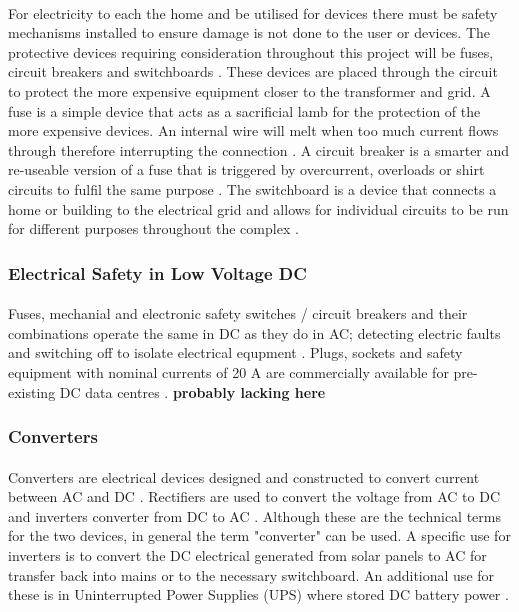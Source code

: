 \paragraph{}
For electricity to each the home and be utilised for devices there must be safety
mechanisms installed to ensure damage is not done to the user or devices. The protective
devices requiring consideration throughout this project will be fuses, circuit breakers
and switchboards \cite{UnitedStatesDepartmentoftheInterior2000}. These devices are placed through the circuit to protect the more expensive equipment closer to the transformer and grid. A fuse is a simple device that acts as a sacrificial lamb for the protection of the more expensive devices. An internal wire will melt when too much current flows through therefore interrupting the connection
\cite{UnitedStatesDepartmentoftheInterior2000}. A circuit breaker is a smarter and re-useable version of a fuse that is triggered by overcurrent, overloads or shirt circuits to fulfil the same purpose \cite{UnitedStatesDepartmentoftheInterior2000}. The switchboard is
a device that connects a home or building to the electrical grid and allows for individual
circuits to be run for different purposes throughout the complex \cite{UnitedStatesDepartmentoftheInterior2000}.

\subsubsection{Electrical Safety in Low Voltage DC}

\paragraph{}
Fuses, mechanial and electronic safety switches / circuit breakers and their combinations operate the same in DC as they do in AC; detecting electric faults and switching off to isolate electrical equpment \cite{Meckler2014}. Plugs, sockets and safety equipment with nominal currents of 20 \si{A} are commercially available for pre-existing DC data centres \cite{Meckler2014}. \textbf{probably lacking here} 

\subsubsection{Converters}

\paragraph{}
Converters are electrical devices designed and constructed to convert current between AC and DC \cite{website:ConvVsInverter}. Rectifiers are used to convert the voltage from AC to DC and inverters converter from DC to AC \cite{website:ConvVsInverter}. Although these are the technical terms for the two devices, in general the term "converter" can be used. A specific use for inverters is to convert the DC electrical generated from solar panels to AC for transfer back into mains or to the necessary switchboard. An additional use for these is in Uninterrupted Power Supplies (UPS) where stored DC battery power \cite{website:ConvVsInverter}.

